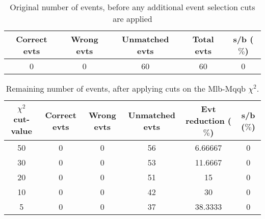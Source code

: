 \documentclass{article}
\begin{document}
 

 \begin{abstract} 
 
   The tables in this document represent the influence of the additional event selection cuts that were applied in order to reduce the number of selected events for CPU reasons. \\ 
   The considered cuts are rather basic and are merely developed to reduce the number of so-called wrong events \\ 
   \begin{itemize} 
     \item Cut on Mlb-Mqqb $\chi^{2}$ distribution 
     \item Cut on top and W-mass window 
   \end{itemize} 
 
   \textbf{Created on :} \today 
 \end{abstract} 
 
 \begin{table}[h!t] 
  \caption{Original number of events, before any additional event selection cuts are applied} 
  \centering 
   \begin{tabular}{c|c|c|c|c} 
     Correct evts    & Wrong evts     & Unmatched evts      &  Total evts & s/b ($\%$)     \\ 
     \hline
     0   &   0  & 60 & 60  & 0 
 
   \end{tabular} 
 \end{table} 
 
 \begin{table}[h!t] 
  \caption{Remaining number of events, after applying cuts on the Mlb-Mqqb $\chi^{2}$.} 
  \centering 
   \begin{tabular}{c|c|c|c|c|c} 
     $\chi^{2}$ cut-value    & Correct evts    & Wrong evts     & Unmatched evts  & Evt reduction ($\%$)    & s/b ($\%$)     \\ 
     \hline
     50  &   0  &  0  &  56  &  6.66667 & 0 \\ 
     30  &   0  &  0  &  53  &  11.6667 & 0 \\ 
     20  &   0  &  0  &  51  &  15 & 0 \\ 
     10  &   0  &  0  &  42  &  30 & 0 \\ 
     5  &   0  &  0  &  37  &  38.3333 & 0   \end{tabular} 
 \end{table} 
 
\end{document}
